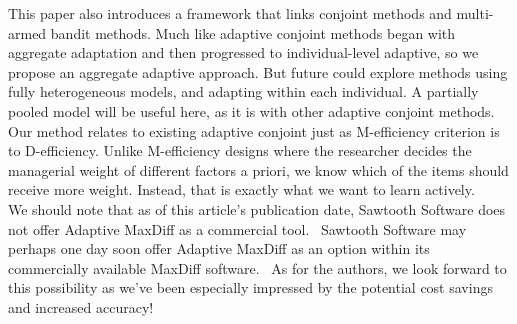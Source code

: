 \documentclass[nonblindrev]{informs3}
\begin{document}
This paper also introduces a framework that links conjoint methods and multi-armed bandit methods. Much like adaptive conjoint methods began with aggregate adaptation and then progressed to individual-level adaptive, so we propose an aggregate adaptive approach. But future could explore methods using fully heterogeneous models, and adapting within each individual. A partially pooled model will be useful here, as it is with other adaptive conjoint methods. \\
Our method relates to existing adaptive conjoint just as M-efficiency criterion is to D-efficiency.  Unlike M-efficiency designs where the researcher decides the managerial weight of different factors a priori, we know which of the items should receive more weight. Instead, that is exactly what we want to learn actively. \\
We should note that as of this article's publication date, Sawtooth Software does not offer Adaptive MaxDiff as a commercial tool.  Sawtooth Software may perhaps one day soon offer Adaptive MaxDiff as an option within its commercially available MaxDiff software.  As for the authors, we look forward to this possibility as we've been especially impressed by the potential cost savings and increased accuracy!








\ACKNOWLEDGMENT{%
}%


%
%
%



\end{document}
